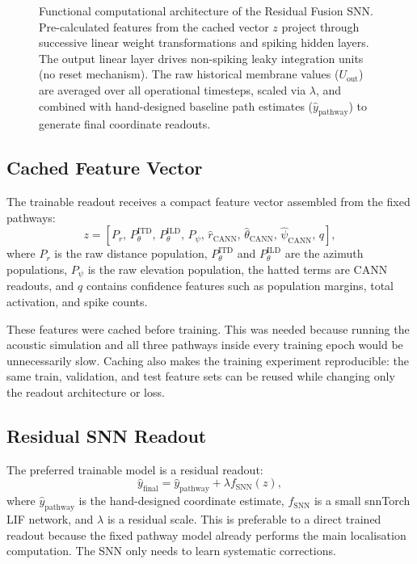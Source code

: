 \begin{figure}[htbp]
\begin{tikzpicture}
    \end{tikzpicture}
    \caption{Functional computational architecture of the Residual Fusion SNN. Pre-calculated features from the cached vector $z$ project through successive linear weight transformations and spiking hidden layers. The output linear layer drives non-spiking leaky integration units (no reset mechanism). The raw historical membrane values ($U_{\text{out}}$) are averaged over all operational timesteps, scaled via $\lambda$, and combined with hand-designed baseline path estimates ($\hat{y}_{\text{pathway}}$) to generate final coordinate readouts.}
    \label{fig:fusion_snn_architecture}
\end{figure}

\subsection{Cached Feature Vector}

The trainable readout receives a compact feature vector assembled from the fixed pathways:
\begin{equation}
    z =
    \left[
    P_r,\,
    P^{\text{ITD}}_{\theta},\,
    P^{\text{ILD}}_{\theta},\,
    P_{\psi},\,
    \hat{r}_{\text{CANN}},\,
    \hat{{\theta}}_{\text{CANN}},\,
    \hat{{\psi}}_{\text{CANN}},\,
    q
    \right],
\end{equation}
where $P_r$ is the raw distance population, $P^{\text{ITD}}_{\theta}$ and $P^{\text{ILD}}_{\theta}$ are the azimuth populations, $P_{\psi}$ is the raw elevation population, the hatted terms are CANN readouts, and $q$ contains confidence features such as population margins, total activation, and spike counts.

These features were cached before training. This was needed because running the acoustic simulation and all three pathways inside every training epoch would be unnecessarily slow. Caching also makes the training experiment reproducible: the same train, validation, and test feature sets can be reused while changing only the readout architecture or loss.

\subsection{Residual SNN Readout}

The preferred trainable model is a residual readout:
\begin{equation}
    \hat{y}_{\text{final}} = \hat{y}_{\text{pathway}} + \lambda f_{\text{SNN}}(z),
\end{equation}
where $\hat{y}_{\text{pathway}}$ is the hand-designed coordinate estimate, $f_{\text{SNN}}$ is a small snnTorch LIF network, and $\lambda$ is a residual scale. This is preferable to a direct trained readout because the fixed pathway model already performs the main localisation computation. The SNN only needs to learn systematic corrections.

